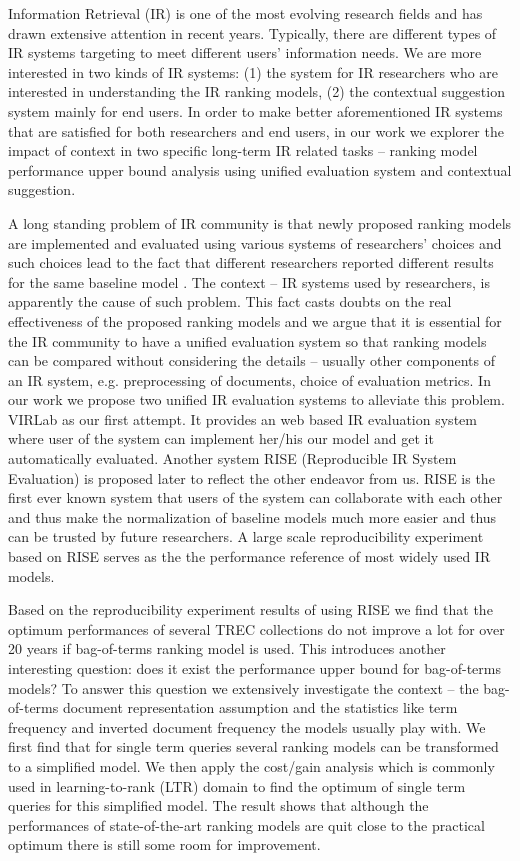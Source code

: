 %
%
Information Retrieval (IR) is one of the most evolving research fields 
and has drawn extensive attention in recent years. 
Typically, there are different types of IR systems targeting to meet 
different users' information needs. We are more interested in two kinds of 
IR systems: (1) the system for IR researchers who are interested in 
understanding the IR ranking models, (2) the contextual suggestion system 
mainly for end users.
In order to make better aforementioned IR systems that are satisfied 
for both researchers and end users, in our work we explorer the impact of 
context in two specific long-term IR related tasks -- ranking model 
performance upper bound analysis using unified evaluation system and contextual suggestion.

A long standing problem of IR community is that newly proposed ranking models 
are implemented and evaluated using various systems of researchers' choices 
and such choices lead to the fact that different researchers reported 
different results for the same baseline model \cite{Yang:2016:RSI:2970398.2970415}. The context -- IR systems used by researchers, 
is apparently the cause of such problem. This fact casts doubts on the real 
effectiveness of the proposed ranking models and we argue that it is 
essential for the IR community to have a unified evaluation system so that 
ranking models can be compared without considering the details -- usually 
other components of an IR system, e.g. preprocessing of documents, choice of 
evaluation metrics. 
In our work we propose two unified IR evaluation systems to alleviate this problem. 
VIRLab as our first attempt. It provides an web based IR evaluation system 
where user of the system can implement her/his our model and get it 
automatically evaluated.
Another system RISE (Reproducible IR System Evaluation) is proposed later 
to reflect the other endeavor from us. 
RISE is the first ever known system that users of the system 
can collaborate with each other and thus make the normalization of baseline 
models much more easier and thus can be trusted by future researchers. 
A large scale reproducibility experiment based on RISE serves as the the 
performance reference of most widely used IR models.

Based on the reproducibility experiment results of using RISE we find that 
the optimum performances of several TREC collections do not improve a lot 
for over 20 years if bag-of-terms ranking model is used. 
This introduces another interesting question: does it exist the performance 
upper bound for bag-of-terms models? To answer this question we extensively 
investigate the context -- the bag-of-terms document representation 
assumption and the statistics like term frequency and inverted document 
frequency the models usually play with.
We first find that for single term queries several ranking models can be 
transformed to a simplified model. 
We then apply the cost/gain analysis which is commonly used in 
learning-to-rank (LTR) domain to find the optimum of single term queries 
for this simplified model.
The result shows that although the performances of state-of-the-art 
ranking models are quit close to the practical optimum there is still some 
room for improvement.

